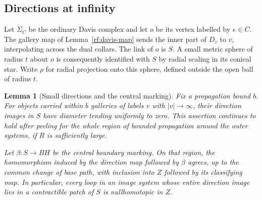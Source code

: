 \documentclass[11pt]{article}
\newtheorem{lemma}[theorem]{Lemma}
\theoremstyle{definition}
\theoremstyle{remark}
\begin{document}
\subsection{Directions at infinity}

Let $\Sigma_C$ be the ordinary Davis complex and let $o$ be its vertex
labelled by $e\in C$.  The gallery map of Lemma~\ref{rf:davis-map} sends
the inner part of $D_v$ to $v$, interpolating across the dual collars.
The link of $o$ is $S$.  A small metric sphere of radius $t$ about $o$
is consequently identified with $S$ by radial scaling in its conical
star.  Write $\rho$ for radial projection onto this sphere, defined
outside the open ball of radius $t$.

\begin{lemma}[Small directions and the central marking]\label{ct:directions}
Fix a propagation bound $b$.  For objects carried within $b$ galleries
of labels $v$ with $|v|\to\infty$, their direction images in $S$ have
diameter tending uniformly to zero.  This assertion continues to hold
after peeling for the whole region of bounded propagation around the
outer systems, if $R$ is sufficiently large.

Let $\beta:S\to BH$ be the central boundary marking.  On that region,
the homomorphism induced by the direction map followed by $\beta$
agrees, up to the common change of base path, with inclusion into
$Z$ followed by its classifying map.  In particular, every loop in an
image system whose entire direction image lies in a contractible
patch of $S$ is nullhomotopic in $Z$.
\end{lemma}
\end{document}
